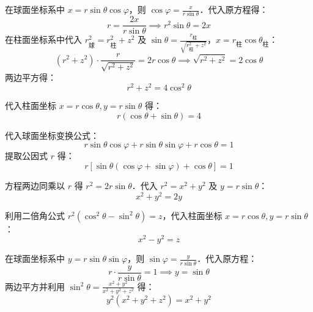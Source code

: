 \begin{solution}
    在球面坐标系中 $x = r \sin \theta \cos \varphi$，则 $\cos \varphi = \frac{x}{r \sin \theta}$．代入原方程得：
    \begin{equation}
        r = \frac{2x}{r \sin \theta} \implies r^2 \sin \theta = 2x
    \end{equation}
    在柱面坐标系中代入 $r_{\text{球}}^2 = r_{\text{柱}}^2 + z^2$ 及 $\sin \theta = \frac{r_{\text{柱}}}{\sqrt{r_{\text{柱}}^2 + z^2}}$，$x = r_{\text{柱}} \cos \theta_{\text{柱}}$：
    \begin{equation}
        (r^2 + z^2) \cdot \frac{r}{\sqrt{r^2 + z^2}} = 2r \cos \theta \implies \sqrt{r^2 + z^2} = 2 \cos \theta
    \end{equation}
    两边平方得：
    \begin{equation}
        \boxed{r^2 + z^2 = 4\cos^2 \theta}
    \end{equation}

    代入柱面坐标 $x = r \cos \theta, y = r \sin \theta$ 得：
    \begin{equation}
        \boxed{r (\cos \theta + \sin \theta) = 4}
    \end{equation}

    代入球面坐标变换公式：
    \begin{equation}
        r \sin \theta \cos \varphi + r \sin \theta \sin \varphi + r \cos \theta = 1
    \end{equation}
    提取公因式 $r$ 得：
    \begin{equation}
        \boxed{r [\sin \theta (\cos \varphi + \sin \varphi) + \cos \theta] = 1}
    \end{equation}

    方程两边同乘以 $r$ 得 $r^2 = 2r \sin \theta$．代入 $r^2 = x^2 + y^2$ 及 $y = r \sin \theta$：
    \begin{equation}
        \boxed{x^2 + y^2 = 2y}
    \end{equation}

    利用二倍角公式 $r^2 (\cos^2 \theta - \sin^2 \theta) = z$，代入柱面坐标 $x = r \cos \theta, y = r \sin \theta$：
    \begin{equation}
        \boxed{x^2 - y^2 = z}
    \end{equation}

    在球面坐标系中 $y = r \sin \theta \sin \varphi$，则 $\sin \varphi = \frac{y}{r \sin \theta}$．代入原方程：
    \begin{equation}
        r \cdot \frac{y}{r \sin \theta} = 1 \implies y = \sin \theta
    \end{equation}
    两边平方并利用 $\sin^2 \theta = \frac{x^2 + y^2}{x^2 + y^2 + z^2}$ 得：
    \begin{equation}
        \boxed{y^2 (x^2 + y^2 + z^2) = x^2 + y^2}
    \end{equation}
\end{solution}


